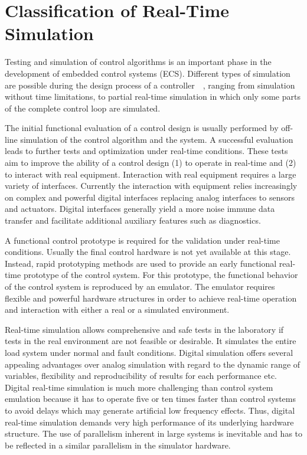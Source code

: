  \section{Classification of Real-Time Simulation}
Testing and simulation of control algorithms is an
important phase in the development of embedded control
systems (ECS). Different types of simulation are possible  
during the design process of a controller~\cite{ram}~\cite{rain}, ranging
from simulation without time limitations, to partial real-time
simulation in which only some parts of the complete
control loop are simulated.
\par The initial functional evaluation of a control design is usually performed by off-line simulation of the control algorithm and the system. A successful evaluation leads to further tests and optimization under real-time conditions. These tests aim to improve the ability of a control design (1) to operate in real-time and (2) to interact with real equipment. Interaction with real equipment requires a large variety of interfaces. Currently the interaction with equipment relies increasingly on complex and powerful digital interfaces replacing analog interfaces to sensors and actuators. Digital interfaces generally yield a more noise immune data transfer and facilitate additional auxiliary features such as diagnostics.\par
A functional control prototype is required for the validation under real-time conditions. Usually the final control hardware is not yet available at this stage. Instead, rapid prototyping methods are used to provide an early functional real-time prototype of the control system. For this prototype, the functional behavior of the control system is reproduced by an emulator. The emulator requires flexible and powerful hardware structures in order to achieve real-time operation and interaction with either a real or a simulated environment.\par  
Real-time simulation allows comprehensive and safe tests in the laboratory if tests in the real environment are not feasible or desirable. It simulates the entire load system under normal and fault conditions. Digital simulation offers several appealing advantages over analog simulation with regard to the dynamic range of variables, flexibility and reproducibility of results for each performance etc. Digital real-time simulation is much more challenging than control system emulation because it has to operate five or ten times faster than control systems to avoid delays which may generate artificial low frequency effects. Thus, digital real-time simulation demands very high performance of its underlying hardware structure. The use of parallelism inherent in large systems is inevitable and has to be reflected in a similar parallelism in the simulator hardware.\par
  
